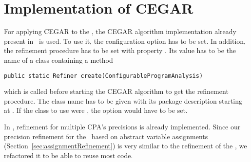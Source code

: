 \chapter{Implementation of CEGAR}
For applying CEGAR to the \symbolicExecutionCPA, the CEGAR algorithm implementation already present in \cpaChecker\ is used.
To use it, the configuration option  has to be set.
In addition, the refinement procedure has to be set with property .
Its value has to be the name of a class containing a method
\begin{lstlisting}
public static Refiner create(ConfigurableProgramAnalysis)
\end{lstlisting}
which is called before starting the CEGAR algorithm to get the refinement procedure.
The class name has to be given with its package description starting at
.
If the class to use were
,
the option  would have to be set.

In \cpaChecker, refinement for multiple CPA's precisions is already implemented.
Since our precision refinement for the \symbolicExecutionCPA\ based on abstract variable assignments (Section~\ref{sec:assignmentRefinement}) is very similar to the refinement of the , we refactored it to be able to reuse most code.



